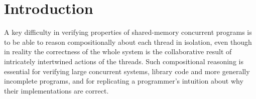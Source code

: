 \vspace*{-10pt}\section{Introduction}\label{sec:introduction}\vspace{-5pt}

A key difficulty in verifying properties of shared-memory concurrent programs is to be able to reason compositionally about each thread in isolation, even though in reality the correctness of the whole system is the collaborative result of intricately intertwined actions of the threads. Such compositional reasoning is essential for verifying large concurrent systems, library code and more generally incomplete programs, and for replicating a programmer's intuition about why their implementations are correct.

